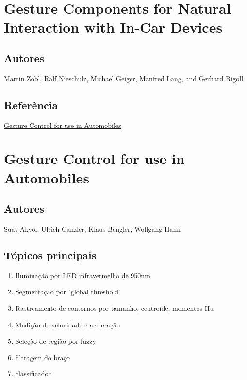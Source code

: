 \section{Gesture Components for Natural Interaction with In-Car Devices}
\label{Gesture Components for Natural Interaction with In-Car Devices}

\subsection{Autores}

Martin Zobl, Ralf Nieschulz, Michael Geiger, Manfred Lang, and Gerhard Rigoll

\subsection{Referência}

\hyperref[Gesture Control for use in Automobiles]{Gesture Control for use in Automobiles}

\section{Gesture Control for use in Automobiles}
\label{Gesture Control for use in Automobiles}

\subsection{Autores}

Suat Akyol, Ulrich Canzler, Klaus Bengler, Wolfgang Hahn

\subsection{Tópicos principais}

\begin{enumerate}
\item Iluminação por LED infravermelho de 950nm
\item Segmentação por "global threshold"
\item Rastreamento de contornos por tamanho, centroide, momentos Hu
\item Medição de velocidade e aceleração
\item Seleção de região por fuzzy
\item filtragem do braço
\item classificador 
\end{enumerate}